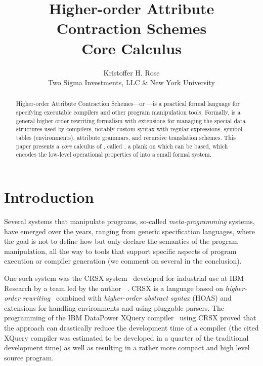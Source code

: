 \documentclass[letterpaper,11pt]{article}
\title{ Higher-order Attribute Contraction Schemes \\ Core Calculus }
\author{ Kristoffer H. Rose \\
 Two Sigma Investments, LLC \& New York University
}
\begin{document}
\maketitle

\begin{abstract}\noindent
  Higher-order Attribute Contraction Schemes---or \HAX---is a practical formal language for
  specifying executable compilers and other program manipulation tools.
  Formally, \HAX is a general higher order rewriting formalism with extensions for managing the
  special data structures used by compilers, notably custom syntax with regular expressions, symbol
  tables (\aka environments), attribute grammars, and recursive translation schemes.
  This paper presents a \emph{core} calculus of \HAX, called \hax, a plank on which \HAX can be
  based, which encodes the low-level operational properties of \HAX into a small formal system.
\end{abstract}


\section{Introduction}\label{sec:intro}

Several systems that manipulate programs, so-called \emph{meta-programming} systems, have emerged
over the years, ranging from generic specification languages, where the goal is not to define how
but only declare the semantics of the program manipulation, all the way to tools that support
specific aspects of program execution or compiler generation (we comment on several in the
conclusion).

One such system was the CRSX system~\cite{Rose:1996} developed for industrial use at IBM Research by
a team led by the author~\cite{Rose:hor2010,Rose:rta2011,crsx} .  CRSX is a language based on
\emph{higher-order rewriting}~\cite{Jouannaud:klop2005} combined with \emph{higher-order abstract
  syntax} (HOAS) \cite{PfenningElliot:pldi1988} and extensions for handling environments and using
pluggable parsers.  The programming of the IBM Data\-Power XQuery compiler~\cite{dp60:ibm2013} using
CRSX proved that the approach can drastically reduce the development time of a compiler (the cited
XQuery compiler was estimated to be developed in a quarter of the traditional development time) as
well as resulting in a rather more compact and high level source program.
\end{document}

